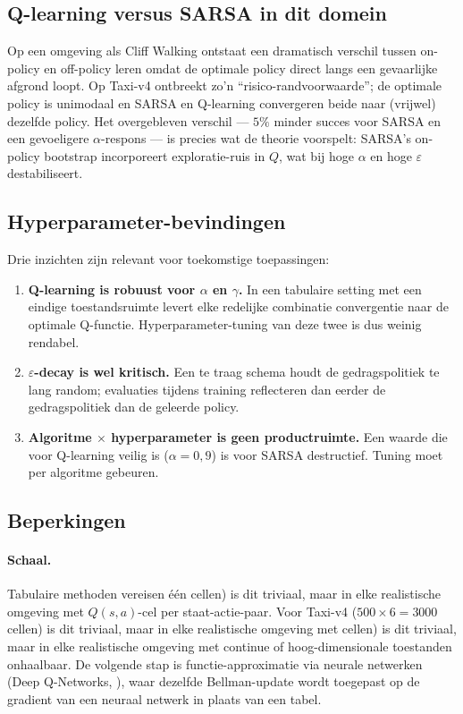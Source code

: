 \documentclass[11pt,a4paper]{article}
\begin{document}
\subsection{Q-learning versus SARSA in dit domein}

Op een omgeving als Cliff Walking
\cite[Voorbeeld 6.6]{sutton_barto_2018} ontstaat een dramatisch
verschil tussen on-policy en off-policy leren omdat de optimale policy
direct langs een gevaarlijke afgrond loopt. Op Taxi-v4 ontbreekt zo'n
``risico-randvoorwaarde''; de optimale policy is unimodaal en SARSA en
Q-learning convergeren beide naar (vrijwel) dezelfde policy. Het
overgebleven verschil --- $5\%$ minder succes voor SARSA en een
gevoeligere $\alpha$-respons --- is precies wat de theorie voorspelt:
SARSA's on-policy bootstrap incorporeert exploratie-ruis in $Q$, wat
bij hoge $\alpha$ en hoge $\varepsilon$ destabiliseert.

\subsection{Hyperparameter-bevindingen}

Drie inzichten zijn relevant voor toekomstige toepassingen:

\begin{enumerate}
  \item \textbf{Q-learning is robuust voor $\alpha$ en $\gamma$.}
        In een tabulaire setting met een eindige toestandsruimte
        levert elke redelijke combinatie convergentie naar de optimale
        Q-functie. Hyperparameter-tuning van deze twee is dus weinig
        rendabel.
  \item \textbf{$\varepsilon$-decay is wel kritisch.} Een te
        traag schema houdt de gedragspolitiek te lang random;
        evaluaties tijdens training reflecteren dan eerder de
        gedragspolitiek dan de geleerde policy.
  \item \textbf{Algoritme $\times$ hyperparameter is geen
        productruimte.} Een waarde die voor Q-learning veilig is
        ($\alpha=0{,}9$) is voor SARSA destructief. Tuning moet per
        algoritme gebeuren.
\end{enumerate}

\subsection{Beperkingen}

\paragraph{Schaal.} Tabulaire methoden vereisen \'e\'en
cellen) is dit triviaal, maar in elke realistische omgeving met
$Q(s,a)$-cel per staat-actie-paar. Voor Taxi-v4 ($500 \times 6 = 3000$
cellen) is dit triviaal, maar in elke realistische omgeving met
cellen) is dit triviaal, maar in elke realistische omgeving met
continue of hoog-dimensionale toestanden onhaalbaar. De volgende stap
is functie-approximatie via neurale netwerken (Deep Q-Networks,
\cite{mnih_2015}), waar dezelfde Bellman-update wordt toegepast op de
gradient van een neuraal netwerk in plaats van een tabel.
\end{document}
